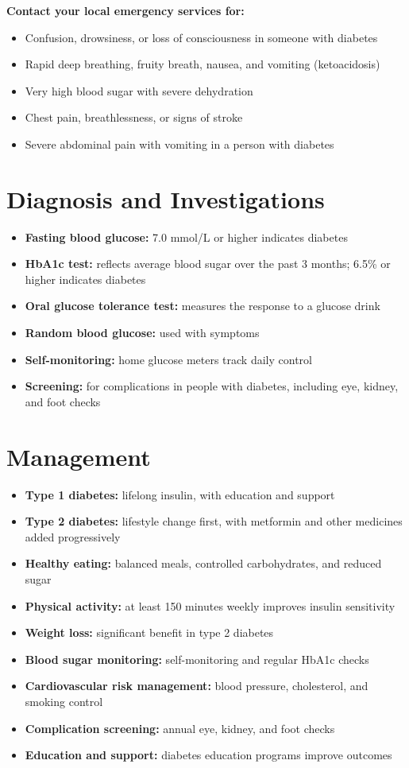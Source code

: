 \textbf{Contact your local emergency services for:}
\begin{itemize}
    \item Confusion, drowsiness, or loss of consciousness in someone with diabetes
    \item Rapid deep breathing, fruity breath, nausea, and vomiting (ketoacidosis)
    \item Very high blood sugar with severe dehydration
    \item Chest pain, breathlessness, or signs of stroke
    \item Severe abdominal pain with vomiting in a person with diabetes
\end{itemize}

\section*{Diagnosis and Investigations}
\begin{itemize}
    \item \textbf{Fasting blood glucose:} 7.0 mmol/L or higher indicates diabetes
    \item \textbf{HbA1c test:} reflects average blood sugar over the past 3 months; 6.5\% or higher indicates diabetes
    \item \textbf{Oral glucose tolerance test:} measures the response to a glucose drink
    \item \textbf{Random blood glucose:} used with symptoms
    \item \textbf{Self-monitoring:} home glucose meters track daily control
    \item \textbf{Screening:} for complications in people with diabetes, including eye, kidney, and foot checks
\end{itemize}

\section*{Management}
\begin{itemize}
    \item \textbf{Type 1 diabetes:} lifelong insulin, with education and support
    \item \textbf{Type 2 diabetes:} lifestyle change first, with metformin and other medicines added progressively
    \item \textbf{Healthy eating:} balanced meals, controlled carbohydrates, and reduced sugar
    \item \textbf{Physical activity:} at least 150 minutes weekly improves insulin sensitivity
    \item \textbf{Weight loss:} significant benefit in type 2 diabetes
    \item \textbf{Blood sugar monitoring:} self-monitoring and regular HbA1c checks
    \item \textbf{Cardiovascular risk management:} blood pressure, cholesterol, and smoking control
    \item \textbf{Complication screening:} annual eye, kidney, and foot checks
    \item \textbf{Education and support:} diabetes education programs improve outcomes
\end{itemize}

